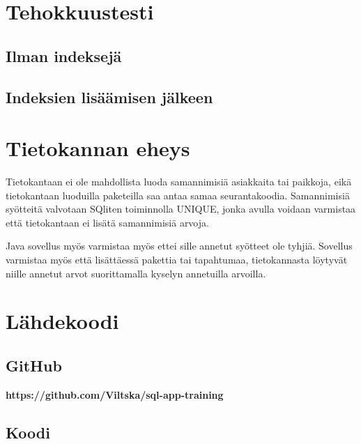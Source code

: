 \documentclass[12pt,a4paper]{article}
\begin{document}
\newpage
\section{Tehokkuustesti}
\subsection*{Ilman indeksejä}
\subsection*{Indeksien lisäämisen jälkeen}

\newpage
\section{Tietokannan eheys}
Tietokantaan ei ole mahdollista luoda samannimisiä asiakkaita tai paikkoja, eikä tietokantaan luoduilla paketeilla saa antaa samaa seurantakoodia. Samannimisiä syötteitä valvotaan SQliten toiminnolla UNIQUE, jonka avulla voidaan varmistaa että tietokantaan ei lisätä samannimisiä arvoja.

Java sovellus myös varmistaa myös ettei sille annetut syötteet ole tyhjiä. Sovellus varmistaa myös että lisättäessä pakettia tai tapahtumaa, tietokannasta löytyvät niille annetut arvot suorittamalla kyselyn annetuilla arvoilla.





\newpage
\section{Lähdekoodi}
\subsection*{GitHub}
\left \textbf{https://github.com/Viltska/sql-app-training} \right
\subsection*{Koodi}


\newpage
\end{document}
